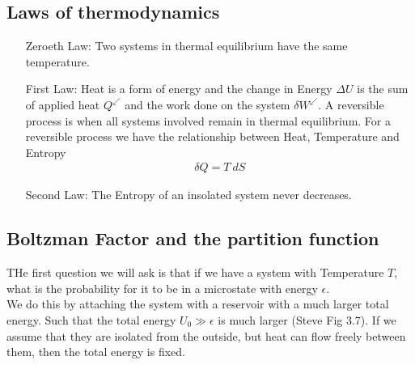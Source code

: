 \subsection{Laws of thermodynamics}
\begin{itemize}
	\item[Zeroeth Law:] Two systems in thermal equilibrium have the same temperature.
	\item[First Law:] Heat is a form of energy and the change in Energy $\Delta U$ is the sum of applied heat $Q^{\swarrow}$ and the work done on the system $\delta W^{\swarrow}$.
		A reversible process is when all systems involved remain in thermal equilibrium.
		For a reversible process we have the relationship between Heat, Temperature and Entropy
		\begin{align*}
			\delta Q = T\ dS
		\end{align*}
	\item[Second Law:] The Entropy of an insolated system never decreases.
\end{itemize}

\subsection{Boltzman Factor and the partition function}

THe first question we will ask is that if we have a system with Temperature $T$, what is the probability for it to be in a microstate with energy $\epsilon$.\\

We do this by attaching the system with a reservoir with a much larger total energy. Such that the total energy $U_0 \gg \epsilon$ is much larger (Steve Fig 3.7). If we assume that they are isolated from the outside, but heat can flow freely between them, then the total energy is fixed.

